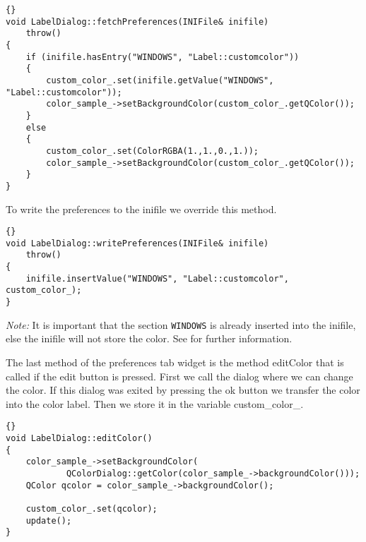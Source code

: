 \begin{lstlisting}{}
void LabelDialog::fetchPreferences(INIFile& inifile)
	throw()
{
	if (inifile.hasEntry("WINDOWS", "Label::customcolor"))
	{
		custom_color_.set(inifile.getValue("WINDOWS", "Label::customcolor"));
		color_sample_->setBackgroundColor(custom_color_.getQColor());
	}
	else
	{
		custom_color_.set(ColorRGBA(1.,1.,0.,1.));
		color_sample_->setBackgroundColor(custom_color_.getQColor());
	}			
}
\end{lstlisting}

To write the preferences to the inifile we override this method.

\begin{lstlisting}{}
void LabelDialog::writePreferences(INIFile& inifile)
	throw()
{
	inifile.insertValue("WINDOWS", "Label::customcolor", custom_color_);
}
\end{lstlisting}

{\em Note:} It is important that the section {\tt WINDOWS} is
already inserted into the inifile, else the inifile will not store the color.
See  for further information.

The last method of the preferences tab widget is the method editColor  that
is called if the edit button is pressed.
First we call the dialog  where we can change the color.
If this dialog was exited by pressing the ok button we transfer the color into
the color label. Then we store it in the variable custom\_color\_.

\begin{lstlisting}{}
void LabelDialog::editColor()
{
	color_sample_->setBackgroundColor(
			QColorDialog::getColor(color_sample_->backgroundColor()));
	QColor qcolor = color_sample_->backgroundColor();

	custom_color_.set(qcolor);
	update();
}
\end{lstlisting}

